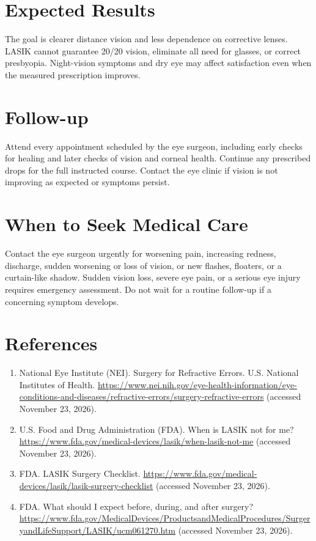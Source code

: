 \section*{Expected Results}
The goal is clearer distance vision and less dependence on corrective lenses. LASIK cannot guarantee 20/20 vision, eliminate all need for glasses, or correct presbyopia. Night-vision symptoms and dry eye may affect satisfaction even when the measured prescription improves.

\section*{Follow-up}
Attend every appointment scheduled by the eye surgeon, including early checks for healing and later checks of vision and corneal health. Continue any prescribed drops for the full instructed course. Contact the eye clinic if vision is not improving as expected or symptoms persist.

\section*{When to Seek Medical Care}
Contact the eye surgeon urgently for worsening pain, increasing redness, discharge, sudden worsening or loss of vision, or new flashes, floaters, or a curtain-like shadow. Sudden vision loss, severe eye pain, or a serious eye injury requires emergency assessment. Do not wait for a routine follow-up if a concerning symptom develops.

\section*{References}
\begin{enumerate}
  \item National Eye Institute (NEI). Surgery for Refractive Errors. U.S. National Institutes of Health. \url{https://www.nei.nih.gov/eye-health-information/eye-conditions-and-diseases/refractive-errors/surgery-refractive-errors} (accessed November 23, 2026).
  \item U.S. Food and Drug Administration (FDA). When is LASIK not for me? \url{https://www.fda.gov/medical-devices/lasik/when-lasik-not-me} (accessed November 23, 2026).
  \item FDA. LASIK Surgery Checklist. \url{https://www.fda.gov/medical-devices/lasik/lasik-surgery-checklist} (accessed November 23, 2026).
  \item FDA. What should I expect before, during, and after surgery? \url{https://www.fda.gov/MedicalDevices/ProductsandMedicalProcedures/SurgeryandLifeSupport/LASIK/ucm061270.htm} (accessed November 23, 2026).
\end{enumerate}

\clearpage
